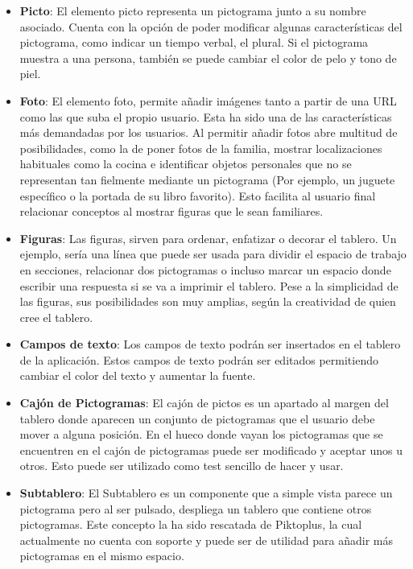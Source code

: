 \begin{itemize}
	
	
\item \textbf{Picto}: El elemento picto representa un pictograma junto a su nombre asociado. Cuenta con la opción de poder modificar algunas características del pictograma, como indicar un tiempo verbal, el plural. Si el pictograma muestra a una persona, también se puede cambiar el color de pelo y tono de piel.

\item \textbf{Foto}: El elemento foto, permite añadir imágenes tanto a partir de una URL como las que suba el propio usuario. Esta ha sido una de las características más demandadas por los usuarios. Al permitir añadir fotos abre multitud de posibilidades, como la de poner fotos de la familia, mostrar localizaciones habituales como la cocina e identificar objetos personales que no se representan tan fielmente mediante un pictograma (Por ejemplo, un juguete específico o la portada de su  libro favorito). Esto facilita al usuario final relacionar conceptos al mostrar figuras que le sean familiares.

\item \textbf{Figuras}: Las figuras, sirven para ordenar, enfatizar o decorar el tablero. Un ejemplo, sería una línea que puede ser usada para dividir el espacio de trabajo en secciones, relacionar dos pictogramas o incluso marcar un espacio donde escribir una respuesta si se va a imprimir el tablero. Pese a la simplicidad de las figuras, sus posibilidades son muy amplias, según  la creatividad de quien cree el tablero.

\item \textbf{Campos de texto}: Los campos de texto podrán ser insertados en el tablero de la aplicación. Estos campos de texto podrán ser editados permitiendo cambiar el color del texto y aumentar la fuente.

\item \textbf{Cajón de Pictogramas}: El cajón de pictos es un apartado al margen del tablero donde aparecen un conjunto de pictogramas que el usuario debe mover a alguna posición. En el hueco donde vayan los pictogramas que se encuentren en el cajón de pictogramas puede ser modificado y aceptar unos u otros. Esto puede ser utilizado como test sencillo de hacer y usar.

\item \textbf{Subtablero}: El Subtablero es un componente que a simple vista parece un pictograma pero al ser pulsado, despliega un tablero que contiene otros pictogramas. Este concepto la ha sido rescatada de Piktoplus, la cual actualmente no cuenta con soporte y puede ser de utilidad para añadir más pictogramas en el mismo espacio.
\end{itemize}

